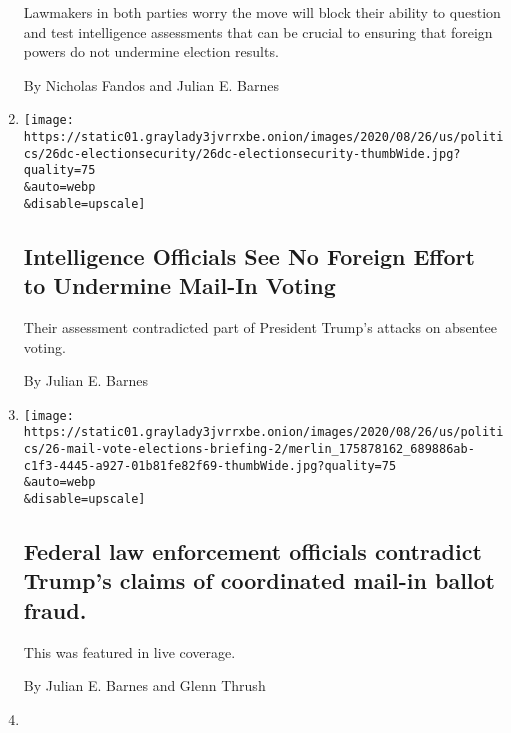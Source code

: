 \begin{enumerate}
  Lawmakers in both parties worry the move will block their ability to
  question and test intelligence assessments that can be crucial to
  ensuring that foreign powers do not undermine election results.

  By Nicholas Fandos and Julian E. Barnes
\item
  \href{/2020/08/26/us/politics/mail-in-voting-foreign-intervention.html}{}

  \texttt{[image: https://static01.graylady3jvrrxbe.onion/images/2020/08/26/us/politics/26dc-electionsecurity/26dc-electionsecurity-thumbWide.jpg?quality=75\\\&auto=webp\\\&disable=upscale]}

  \hypertarget{intelligence-officials-see-no-foreign-effort-to-undermine-mail-in-voting}{%
  \subsection{Intelligence Officials See No Foreign Effort to Undermine
  Mail-In
  Voting}\label{intelligence-officials-see-no-foreign-effort-to-undermine-mail-in-voting}}

  Their assessment contradicted part of President Trump's attacks on
  absentee voting.

  By Julian E. Barnes
\item
  \href{/live/2020/08/26/us/rnc-convention-election/federal-law-enforcement-officials-contradict-trumps-claims-of-coordinated-mail-in-ballot-fraud}{}

  \texttt{[image: https://static01.graylady3jvrrxbe.onion/images/2020/08/26/us/politics/26-mail-vote-elections-briefing-2/merlin\_175878162\_689886ab-c1f3-4445-a927-01b81fe82f69-thumbWide.jpg?quality=75\\\&auto=webp\\\&disable=upscale]}

  \hypertarget{federal-law-enforcement-officials-contradict-trumps-claims-of-coordinated-mail-in-ballot-fraud}{%
  \subsection{Federal law enforcement officials contradict Trump's
  claims of coordinated mail-in ballot
  fraud.}\label{federal-law-enforcement-officials-contradict-trumps-claims-of-coordinated-mail-in-ballot-fraud}}

  This was featured in live coverage.

  By Julian E. Barnes and Glenn Thrush
\item
  \href{/2020/08/22/us/elections/brennan-is-told-he-is-not-a-target-of-criminal-inquiry-into-russia-investigation.html}{}


\end{enumerate}
